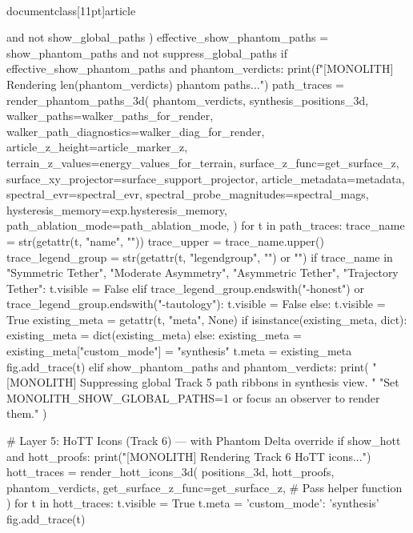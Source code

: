 \\documentclass[11pt]{article}
\begin{document}
\begin{CodeBlock}
{{{{{        and not show_global_paths
    )
    effective_show_phantom_paths = show_phantom_paths and not suppress_global_paths
    if effective_show_phantom_paths and phantom_verdicts:
        print(f"[MONOLITH] Rendering {len(phantom_verdicts)} phantom paths...")
        path_traces = render_phantom_paths_3d(
            phantom_verdicts, synthesis_positions_3d,
            walker_paths=walker_paths_for_render,
            walker_path_diagnostics=walker_diag_for_render,
            article_z_height=article_marker_z,
            terrain_z_values=energy_values_for_terrain,
            surface_z_func=get_surface_z,
            surface_xy_projector=surface_support_projector,
            article_metadata=metadata,
            spectral_evr=spectral_evr,
            spectral_probe_magnitudes=spectral_mags,
            hysteresis_memory=exp.hysteresis_memory,
            path_ablation_mode=path_ablation_mode,
        )
        for t in path_traces:
            trace_name = str(getattr(t, "name", ""))
            trace_upper = trace_name.upper()
            trace_legend_group = str(getattr(t, "legendgroup", "") or "")
            if trace_name in {"Symmetric Tether", "Moderate Asymmetry", "Asymmetric Tether", "Trajectory Tether"}:
                t.visible = False
            elif trace_legend_group.endswith("-honest") or trace_legend_group.endswith("-tautology"):
                t.visible = False
            else:
                t.visible = True
            existing_meta = getattr(t, "meta", None)
            if isinstance(existing_meta, dict):
                existing_meta = dict(existing_meta)
            else:
                existing_meta = {}
            existing_meta["custom_mode"] = "synthesis"
            t.meta = existing_meta
            fig.add_trace(t)
    elif show_phantom_paths and phantom_verdicts:
        print(
            "[MONOLITH] Suppressing global Track 5 path ribbons in synthesis view. "
            "Set MONOLITH_SHOW_GLOBAL_PATHS=1 or focus an observer to render them."
        )

        # Layer 5: HoTT Icons (Track 6) — with Phantom Delta override
        if show_hott and hott_proofs:
            print("[MONOLITH] Rendering Track 6 HoTT icons...")
            hott_traces = render_hott_icons_3d(
                positions_3d, hott_proofs, phantom_verdicts,
                get_surface_z_func=get_surface_z, # Pass helper function
            )
            for t in hott_traces:
                t.visible = True
                t.meta = {'custom_mode': 'synthesis'}
                fig.add_trace(t)

}}}}}
\end{CodeBlock}
\end{document}
